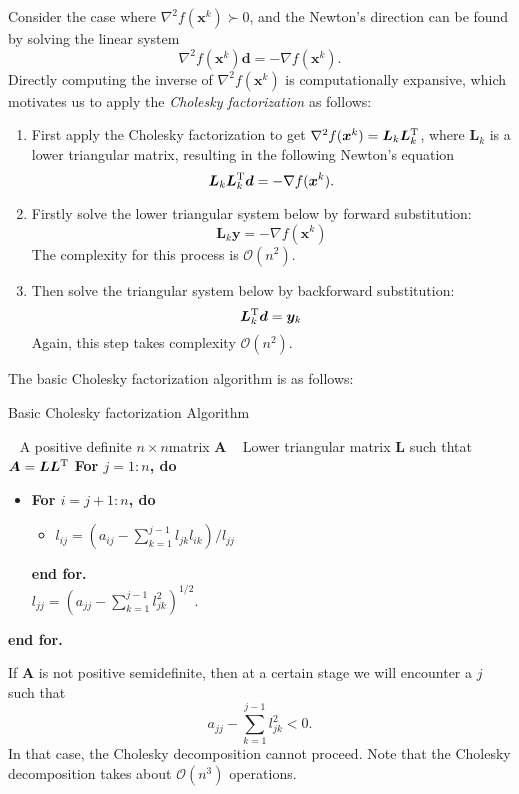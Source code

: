 Consider the case where $\nabla^2f(\bm x^k)\succ0$, and the Newton's direction can be found by solving the linear system
\[
\nabla^2f(\bm x^k)\bm d = -\nabla f(\bm x^k).
\]
Directly computing the inverse of $\nabla^2f(\bm x^k)$ is computationally expansive, which motivates us to apply the \emph{Cholesky factorization} as follows:
\begin{enumerate}
\item
First apply the Cholesky factorization to get $\nabla^2f(\bm x^k) = \bm L_k\bm L_k^{\mathrm T}$, where $\bm L_k$ is a lower triangular matrix, resulting in the following Newton's equation
\[
\bm L_k\bm L_k^{\mathrm T}\bm d = -\nabla f(\bm x^k).
\]
\item
Firstly solve the lower triangular system below by forward substitution:
\[
\bm L_k\bm y = -\nabla f(\bm x^k)
\]
The complexity for this process is $\mathcal{O}(n^2)$.
\item
Then solve the triangular system below by backforward substitution:
\[
\bm L_k^{\mathrm T}\bm d = \bm y_k
\]
Again, this step takes complexity $\mathcal{O}(n^2)$.
\end{enumerate}

The basic Cholesky factorization algorithm is as follows:
\begin{algorithm}[htb] 
\caption{Basic Cholesky factorization Algorithm} 
\label{alg:CFA} 
\begin{algorithmic}[0] %
\REQUIRE ~ %
A positive definite $n\times n$matrix $\bm A$
\ENSURE ~ %
Lower triangular matrix $\bm L$ such thtat $\bm A=\bm L\bm L^{\mathrm T}$
\STATE \textbf{For $j=1:n$, do}
\begin{itemize}
\item
\textbf{For $i=j+1:n$, do}
\begin{itemize}
\item
$l_{ij} = \left(a_{ij} - \sum_{k=1}^{j-1}l_{jk}l_{ik}\right)/l_{jj}$
\end{itemize}
\textbf{end for.}\\
$l_{jj} = \left(a_{jj} - \sum_{k=1}^{j-1}l_{jk}^2\right)^{1/2}$.
\end{itemize}
\textbf{end for.}
\label{code:GA}
\end{algorithmic}
\end{algorithm}
\begin{remark}
If $\bm A$ is not positive semidefinite, then at a certain stage we will encounter a $j$ such that \[a_{jj} - \sum_{k=1}^{j-1}l_{jk}^2<0.\]
In that case, the Cholesky decomposition cannot proceed. 
Note that the Cholesky decomposition takes about $\mathcal{O}(n^3)$ operations.
\end{remark}

